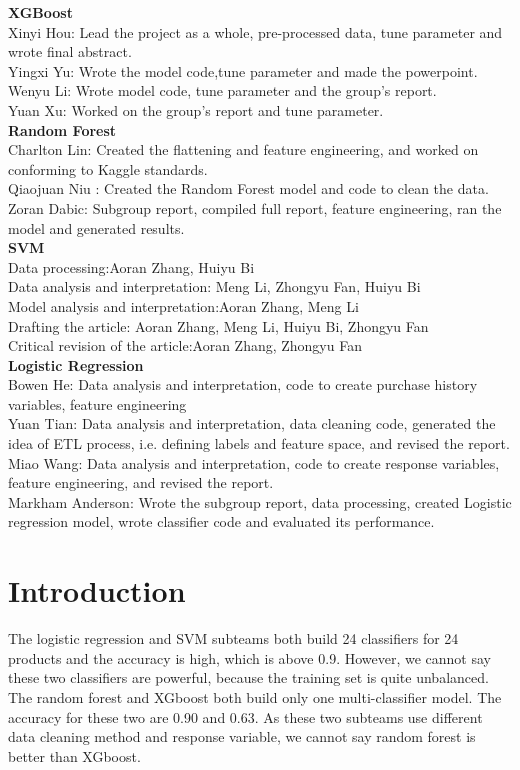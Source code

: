 \documentclass{article}
\begin{document}
\begin{spacing}{1}
\begin{large}
\begin{multicols}{2}
\textbf{XGBoost} \\
Xinyi Hou: Lead the project as a whole, pre-processed data, tune parameter and wrote final abstract. \\
Yingxi Yu:  Wrote the model code,tune parameter and made the powerpoint. \\
Wenyu Li: Wrote model code, tune parameter and the group's report. \\
Yuan Xu:  Worked on the group's report and tune parameter. \\
\textbf{Random Forest} \\
Charlton Lin: Created the flattening and feature engineering, and worked on conforming to Kaggle standards. \\
Qiaojuan Niu : Created the Random Forest model and code to clean the data. \\
Zoran Dabic: Subgroup report, compiled full report, feature engineering, ran the model and generated results. \\
\textbf{SVM} \\
Data processing:Aoran Zhang, Huiyu Bi \\
Data analysis and interpretation: Meng Li, Zhongyu Fan, Huiyu Bi \\
Model analysis and interpretation:Aoran Zhang, Meng Li \\
Drafting the article: Aoran Zhang, Meng Li, Huiyu Bi, Zhongyu Fan \\
Critical revision of the article:Aoran Zhang, Zhongyu Fan \\
\textbf{Logistic Regression} \\
Bowen He:  Data analysis and interpretation, code to create purchase history variables, feature engineering\\
Yuan Tian:  Data analysis and interpretation, data cleaning code, generated the idea of ETL process, i.e. defining labels and feature space, and revised the report. \\
Miao Wang:  Data analysis and interpretation, code to create response variables, feature engineering, and revised the report. \\
Markham Anderson: Wrote the subgroup report, data processing, created Logistic regression model, wrote classifier code and evaluated its performance. \\

\end{multicols}

\newpage

\section{Introduction}
The logistic regression and SVM subteams both build 24 classifiers for 24 products and the accuracy is high, which is above 0.9. However, we cannot say these two classifiers are powerful, because the training set is quite unbalanced. The random forest and XGboost both build only one multi-classifier model. The accuracy for these two are 0.90 and 0.63. As these two subteams use different data cleaning method and response variable, we cannot say random forest is better than XGboost. 



\end{large}
\end{spacing}
\end{document}
